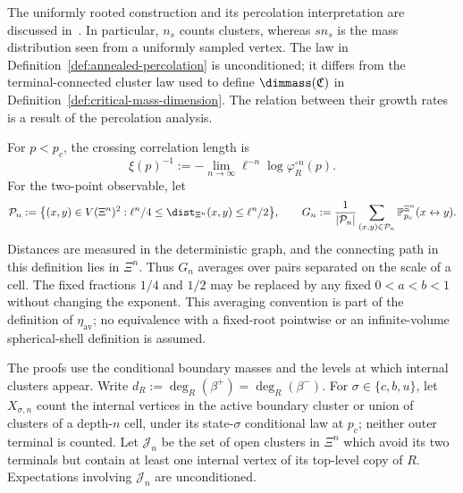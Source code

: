 The uniformly rooted construction and its percolation interpretation are discussed in~\cite{alves2026percolation}.
In particular, $n_s$ counts clusters, whereas $s n_s$ is the mass distribution seen from a uniformly sampled vertex.
The law in Definition~\ref{def:annealed-percolation} is unconditioned; it differs from the terminal-connected cluster law used to define $\dimmass(\mathfrak C)$ in Definition~\ref{def:critical-mass-dimension}.
The relation between their growth rates is a result of the percolation analysis.

For $p<p_c$, the crossing correlation length is
\[
 \xi(p)^{-1}:=-\lim_{n\to\infty}\ell^{-n}
 \log\varphi_R^{\circ n}(p).
\]
For the two-point observable, let
\[
 \mathcal P_n:=\bigl\{(x,y)\in V(\Xi^n)^2:
 \ell^n/4\le\dist_{\Xi^n}(x,y)\le\ell^n/2\bigr\},\qquad
 G_n:=\frac1{|\mathcal P_n|}\sum_{(x,y)\in\mathcal P_n}
 \mathbb P_{p_c}^{\Xi^n}(x\leftrightarrow y).
\]
Distances are measured in the deterministic graph, and the connecting path in this definition lies in $\Xi^n$.
Thus $G_n$ averages over pairs separated on the scale of a cell.
The fixed fractions $1/4$ and $1/2$ may be replaced by any fixed $0<a<b<1$ without changing the exponent.
This averaging convention is part of the definition of $\eta_{\mathrm{av}}$; no equivalence with a fixed-root pointwise or an infinite-volume spherical-shell definition is assumed.

The proofs use the conditional boundary masses and the levels at which internal clusters appear.
Write $d_R:=\deg_R(\beta^+)=\deg_R(\beta^-)$.
For $\sigma\in\{c,b,u\}$, let $X_{\sigma,n}$ count the internal vertices in the active boundary cluster or union of clusters of a depth-$n$ cell, under its state-$\sigma$ conditional law at $p_c$; neither outer terminal is counted.
Let $\mathcal J_n$ be the set of open clusters in $\Xi^n$ which avoid its two terminals but contain at least one internal vertex of its top-level copy of $R$.
Expectations involving $\mathcal J_n$ are unconditioned.

